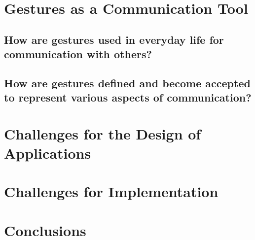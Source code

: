 \documentclass{article}
\begin{document}
\section{Gestures as a Communication Tool}

\subsection{How are gestures used in everyday life for communication with others?}
\subsection{How are gestures defined and become accepted to represent various aspects of
communication?}

\section{Challenges for the Design of Applications}

\section{Challenges for Implementation}

\section{Conclusions}
\end{document}
